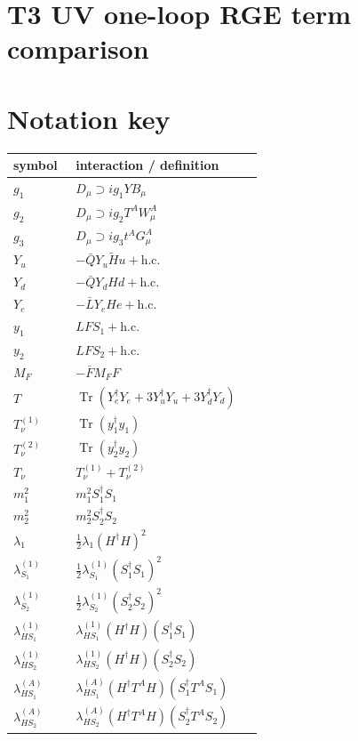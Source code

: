 \documentclass[8pt]{article}
\begin{document}
\begin{landscape}
\section*{T3 UV one-loop RGE term comparison}
\section*{Notation key}
\begin{longtable}{@{}p{0.23\linewidth}p{0.69\linewidth}@{}}
\toprule
symbol & interaction / definition \\
\midrule
$g_1$ & $D_\mu\supset i g_1YB_\mu$ \\
$g_2$ & $D_\mu\supset i g_2T^AW_\mu^A$ \\
$g_3$ & $D_\mu\supset i g_3t^AG_\mu^A$ \\
$Y_u$ & $-\bar QY_u\widetilde Hu+\mathrm{h.c.}$ \\
$Y_d$ & $-\bar QY_dHd+\mathrm{h.c.}$ \\
$Y_e$ & $-\bar LY_eHe+\mathrm{h.c.}$ \\
$y_1$ & $LFS_1+\mathrm{h.c.}$ \\
$y_2$ & $LFS_2+\mathrm{h.c.}$ \\
$M_F$ & $-\bar FM_FF$ \\
$T$ & $\operatorname{Tr}(Y_e^\dagger Y_e+3Y_u^\dagger Y_u+3Y_d^\dagger Y_d)$ \\
$T_\nu^{(1)}$ & $\operatorname{Tr}(y_1^\dagger y_1)$ \\
$T_\nu^{(2)}$ & $\operatorname{Tr}(y_2^\dagger y_2)$ \\
$T_\nu$ & $T_\nu^{(1)}+T_\nu^{(2)}$ \\
$m_1^2$ & $m_1^2S_1^\dagger S_1$ \\
$m_2^2$ & $m_2^2S_2^\dagger S_2$ \\
$\lambda_1$ & $\frac12\lambda_1(H^\dagger H)^2$ \\
$\lambda_{S_1}^{(1)}$ & $\frac12\lambda_{S_1}^{(1)}(S_1^\dagger S_1)^2$ \\
$\lambda_{S_2}^{(1)}$ & $\frac12\lambda_{S_2}^{(1)}(S_2^\dagger S_2)^2$ \\
$\lambda_{HS_1}^{(1)}$ & $\lambda_{HS_1}^{(1)}(H^\dagger H)(S_1^\dagger S_1)$ \\
$\lambda_{HS_2}^{(1)}$ & $\lambda_{HS_2}^{(1)}(H^\dagger H)(S_2^\dagger S_2)$ \\
$\lambda_{HS_1}^{(A)}$ & $\lambda_{HS_1}^{(A)}(H^\dagger T^AH)(S_1^\dagger T^AS_1)$ \\
$\lambda_{HS_2}^{(A)}$ & $\lambda_{HS_2}^{(A)}(H^\dagger T^AH)(S_2^\dagger T^AS_2)$ \\

\end{longtable}
\end{landscape}
\end{document}

